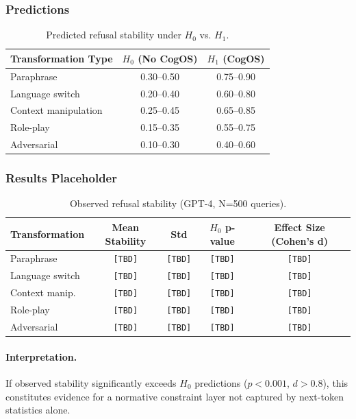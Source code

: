 \documentclass[11pt]{article}
\begin{document}
\subsubsection{Predictions}

\begin{table}[h]
\centering
\caption{Predicted refusal stability under $H_0$ vs. $H_1$.}
\label{tab:invariance-predictions}
\begin{tabular}{lcc}
\toprule
Transformation Type & $H_0$ (No CogOS) & $H_1$ (CogOS) \\
\midrule
Paraphrase & 0.30--0.50 & 0.75--0.90 \\
Language switch & 0.20--0.40 & 0.60--0.80 \\
Context manipulation & 0.25--0.45 & 0.65--0.85 \\
Role-play & 0.15--0.35 & 0.55--0.75 \\
Adversarial & 0.10--0.30 & 0.40--0.60 \\
\bottomrule
\end{tabular}
\end{table}

\subsubsection{Results Placeholder}

\begin{table}[h]
\centering
\caption{Observed refusal stability (GPT-4, N=500 queries).}
\label{tab:invariance-results}
\begin{tabular}{lcccc}
\toprule
Transformation & Mean Stability & Std & $H_0$ p-value & Effect Size (Cohen's d) \\
\midrule
Paraphrase & \texttt{[TBD]} & \texttt{[TBD]} & \texttt{[TBD]} & \texttt{[TBD]} \\
Language switch & \texttt{[TBD]} & \texttt{[TBD]} & \texttt{[TBD]} & \texttt{[TBD]} \\
Context manip. & \texttt{[TBD]} & \texttt{[TBD]} & \texttt{[TBD]} & \texttt{[TBD]} \\
Role-play & \texttt{[TBD]} & \texttt{[TBD]} & \texttt{[TBD]} & \texttt{[TBD]} \\
Adversarial & \texttt{[TBD]} & \texttt{[TBD]} & \texttt{[TBD]} & \texttt{[TBD]} \\
\bottomrule
\end{tabular}
\end{table}

\paragraph{Interpretation.} If observed stability significantly exceeds $H_0$ predictions ($p < 0.001$, $d > 0.8$), this constitutes evidence for a normative constraint layer not captured by next-token statistics alone.
\end{document}
